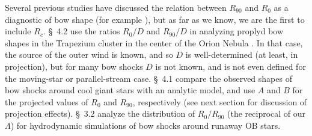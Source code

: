 Several previous studies have discussed the relation between
\(R_{90}\) and \(R_0\) as a diagnostic of bow shape (for example
\citealp{Robberto:2005, Cox:2012a, Meyer:2016a}), but as far as we
know, we are the first to include \(R_c\).  \citet{Robberto:2005}
\S~4.2 use the ratios \(R_0/D\) and \(R_{90}/D\) in analyzing proplyd
bow shapes in the Trapezium cluster in the center of the Orion Nebula
\citep{Hayward:1994a, Garcia-Arredondo:2001a, Smith:2005a}.  In that
case, the source of the outer wind is known, and so \(D\) is
well-determined (at least, in projection), but for many bow shocks
\(D\) is not known, and is not even defined for the moving-star or
parallel-stream case. \citet{Cox:2012a} \S~4.1 compare the observed
shapes of bow shocks around cool giant stars with an analytic model,
and use \(A\) and \(B\) for the projected values of \(R_0\) and
\(R_{90}\), respectively (see next section for discussion of
projection effects).  \citet{Meyer:2016a} \S~3.2 analyze the
distribution of \(R_0 / R_{90}\) (the reciprocal of our \(\Lambda\)) for
hydrodynamic simulations of bow shocks around runaway OB stars.








